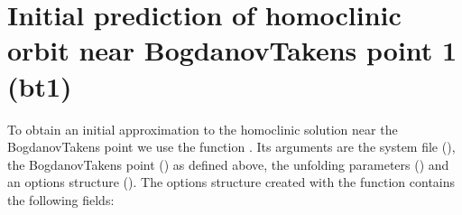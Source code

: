 \documentclass[letterpaper,10pt,english]{jupyterBook}
\begin{document}
\section{Initial prediction of homoclinic orbit near Bogdanov\sphinxhyphen{}Takens point 1  (bt1)}
\label{\detokenize{CO-oxidation:initial-prediction-of-homoclinic-orbit-near-bogdanov-takens-point-1-bt1}}
\sphinxAtStartPar
To obtain an initial approximation to the homoclinic solution near the
Bogdanov\sphinxhyphen{}Takens point we use the function . Its arguments are the
system file (), the Bogdanov\sphinxhyphen{}Takens point () as defined above, the
unfolding parameters  () and an options structure (). The options
structure created with the function  contains the following
fields:
\end{document}
